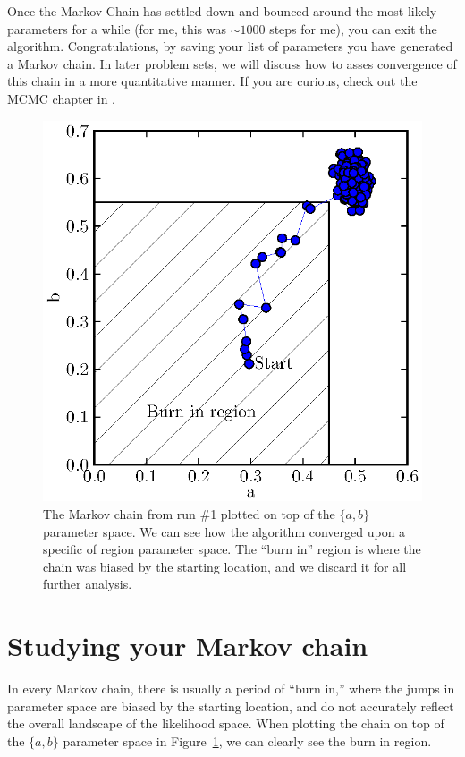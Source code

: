 \documentclass[iop,floatfix]{emulateapj}
\begin{document}
Once the Markov Chain has settled down and bounced around the most likely parameters for a while (for me, this was $\sim 1000$ steps for me), you can exit the algorithm. Congratulations, by saving your list of parameters you have generated a Markov chain. In later problem sets, we will discuss how to asses convergence of this chain in a more quantitative manner. If you are curious, check out the MCMC chapter in \citet{gcs+04}.

\begin{figure}
\begin{center}
  \includegraphics{2d_burn_in}
  \caption{The Markov chain from run \#1 plotted on top of the $\{a,b\}$ parameter space. We can see how the algorithm converged upon a specific of region parameter space. The ``burn in'' region is where the chain was biased by the starting location, and we discard it for all further analysis.}
\label{fig:burn_in}
\end{center}
\end{figure}

\section{Studying your Markov chain}

In every Markov chain, there is usually a period of ``burn in,'' where the jumps in parameter space are biased by the starting location, and do not accurately reflect the overall landscape of the likelihood space. When plotting the chain on top of the $\{a,b\}$ parameter space in Figure~\ref{fig:burn_in}, we can clearly see the burn in region.
\end{document}
